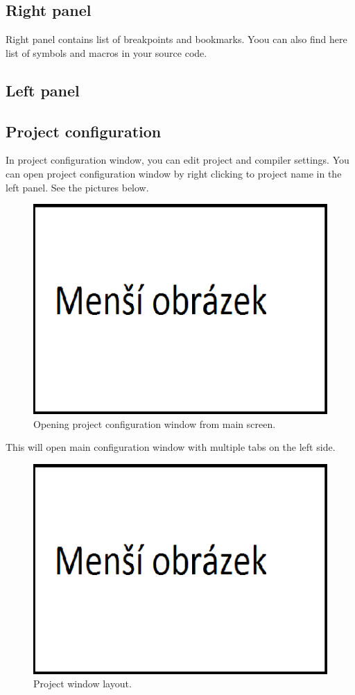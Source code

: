 \subsection{Right panel}
    Right panel contains list of breakpoints and bookmarks. Yoou can also find here list of symbols and macros in your source code.
\subsection{Left panel}

\clearpage
\enlargethispage{6\baselineskip}
\subsection{Project configuration}
    In project configuration window, you can edit project and compiler settings. You can open project configuration window by right clicking to project name in the left panel. See the pictures below.
    \begin{figure}[h]
        \centering{}
        \includegraphics[width=.9\textwidth]{img/mensi_obrazek.png}
        \caption{Opening project configuration window from main screen.}
    \end{figure}

    This will open main configuration window with multiple tabs on the left side.
    \begin{figure}[h!]
        \centering{}
        \includegraphics[width=.9\textwidth]{img/mensi_obrazek.png}
        \caption{Project window layout.}
    \end{figure}

